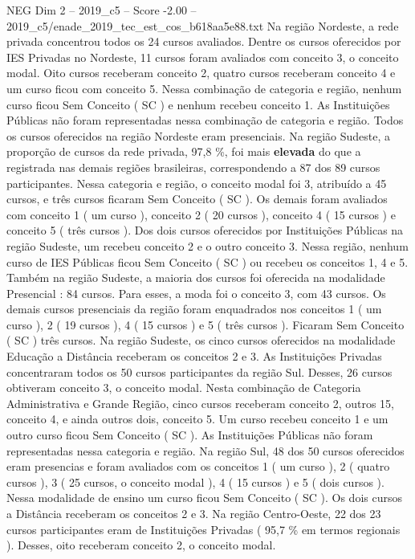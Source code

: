 \begin{textsample}{NEG Dim 2 – 2019\_c5 – Score -2.00 – 2019\_c5/enade\_2019\_tec\_est\_cos\_b618aa5e88.txt}
Na região Nordeste, a rede privada concentrou todos os 24 cursos avaliados.
Dentre os cursos oferecidos por IES Privadas no Nordeste, 11 cursos foram avaliados com conceito 3, o conceito modal.
Oito cursos receberam conceito 2, quatro cursos receberam conceito 4 e um curso ficou com conceito 5.
Nessa combinação de categoria e região, nenhum curso ficou Sem Conceito ( SC ) e nenhum recebeu conceito 1.
As Instituições Públicas não foram representadas nessa combinação de categoria e região.
Todos os cursos oferecidos na região Nordeste eram presenciais.
Na região Sudeste, a proporção de cursos da rede privada, 97,8 \%, foi mais \textbf{elevada} do que a registrada nas demais regiões brasileiras, correspondendo a 87 dos 89 cursos participantes.
Nessa categoria e região, o conceito modal foi 3, atribuído a 45 cursos, e três cursos ficaram Sem Conceito ( SC ).
Os demais foram avaliados com conceito 1 ( um curso ), conceito 2 ( 20 cursos ), conceito 4 ( 15 cursos ) e conceito 5 ( três cursos ).
Dos dois cursos oferecidos por Instituições Públicas na região Sudeste, um recebeu conceito 2 e o outro conceito 3.
Nessa região, nenhum curso de IES Públicas ficou Sem Conceito ( SC ) ou recebeu os conceitos 1, 4 e 5.
Também na região Sudeste, a maioria dos cursos foi oferecida na modalidade Presencial : 84 cursos.
Para esses, a moda foi o conceito 3, com 43 cursos.
Os demais cursos presenciais da região foram enquadrados nos conceitos 1 ( um curso ), 2 ( 19 cursos ), 4 ( 15 cursos ) e 5 ( três cursos ).
Ficaram Sem Conceito ( SC ) três cursos.
Na região Sudeste, os cinco cursos oferecidos na modalidade Educação a Distância receberam os conceitos 2 e 3.
As Instituições Privadas concentraram todos os 50 cursos participantes da região Sul.
Desses, 26 cursos obtiveram conceito 3, o conceito modal.
Nesta combinação de Categoria Administrativa e Grande Região, cinco cursos receberam conceito 2, outros 15, conceito 4, e ainda outros dois, conceito 5.
Um curso recebeu conceito 1 e um outro curso ficou Sem Conceito ( SC ).
As Instituições Públicas não foram representadas nessa categoria e região.
Na região Sul, 48 dos 50 cursos oferecidos eram presencias e foram avaliados com os conceitos 1 ( um curso ), 2 ( quatro cursos ), 3 ( 25 cursos, o conceito modal ), 4 ( 15 cursos ) e 5 ( dois cursos ).
Nessa modalidade de ensino um curso ficou Sem Conceito ( SC ).
Os dois cursos a Distância receberam os conceitos 2 e 3.
Na região Centro-Oeste, 22 dos 23 cursos participantes eram de Instituições Privadas ( 95,7 \% em termos regionais ).
Desses, oito receberam conceito 2, o conceito modal.

\end{textsample}
